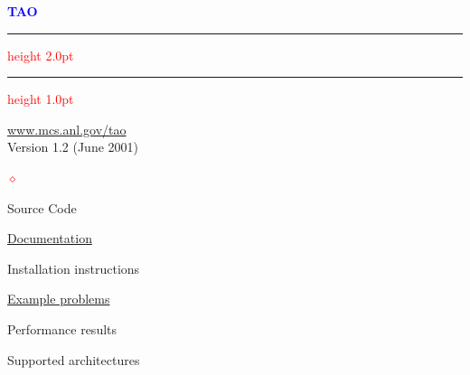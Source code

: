 \documentclass{seminar}
\newcommand{\reddiamond}{\textcolor{red}{$\diamond$}}
\newcommand{\redstripe}{\textcolor{red}{\hrule height 2.0pt\hfil}
             \vspace{-1.8pt}
             \textcolor{red}{\hrule height 1.0pt\hfil}
}
\newcommand{\heading}[1]{%
   \centerline{\textcolor{blue}{\textbf{#1}}}%
    \redstripe%
    \bigskip
}
\begin{document}
\begin{slide}

\heading{TAO}

\begin{center}
\href{https://www.mcs.anl.gov/research/projects/tao/}{www.mcs.anl.gov/tao} \\
Version 1.2 (June 2001)
\end{center}


\begin{list}{\reddiamond}{}
\item
Source Code
\item
\href{https://www.mcs.anl.gov/research/projects/tao/docs/}
{Documentation}
\item
Installation instructions
\item
\href{https://www.mcs.anl.gov/petsc/documentation/installation.html}%
{Example problems}
\item
Performance results
\item
Supported architectures
\end{list}

\vfill

\end{slide}
\end{document}
